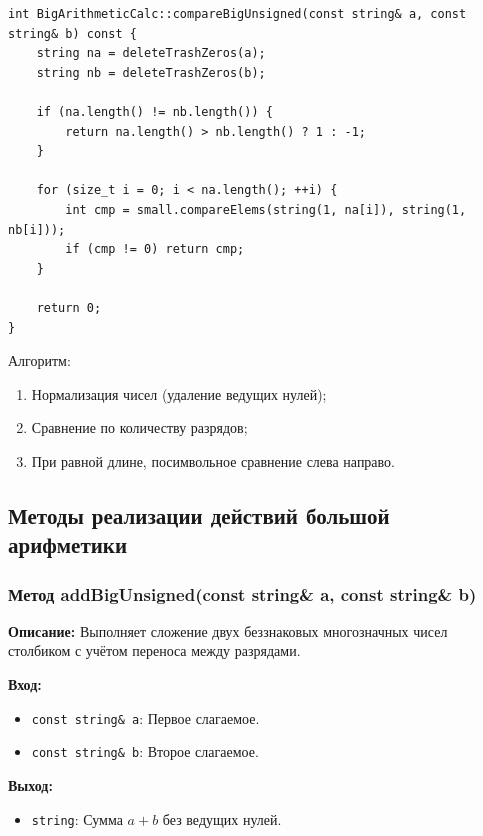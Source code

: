 \begin{lstlisting}[style=cstyle, caption={Реализация compareBigUnsigned()}]
int BigArithmeticCalc::compareBigUnsigned(const string& a, const string& b) const {
    string na = deleteTrashZeros(a);
    string nb = deleteTrashZeros(b);
    
    if (na.length() != nb.length()) {
        return na.length() > nb.length() ? 1 : -1;
    }
    
    for (size_t i = 0; i < na.length(); ++i) {
        int cmp = small.compareElems(string(1, na[i]), string(1, nb[i]));
        if (cmp != 0) return cmp;
    }
    
    return 0;
}
\end{lstlisting}

Алгоритм: 
\begin{enumerate}
    \item Нормализация чисел (удаление ведущих нулей);
    \item Сравнение по количеству разрядов;
    \item При равной длине, посимвольное сравнение слева направо. 
\end{enumerate}

\subsection*{Методы реализации действий большой арифметики}

\subsubsection{Метод addBigUnsigned(const string\& a, const string\& b)}

\textbf{Описание:} Выполняет сложение двух беззнаковых многозначных чисел столбиком с учётом переноса между разрядами.

\textbf{Вход:}
\begin{itemize}
    \item \texttt{const string\& a}: Первое слагаемое.
    \item \texttt{const string\& b}: Второе слагаемое.
\end{itemize}

\textbf{Выход:}
\begin{itemize}
    \item \texttt{string}:  Сумма $a + b$ без ведущих нулей. 
\end{itemize}

